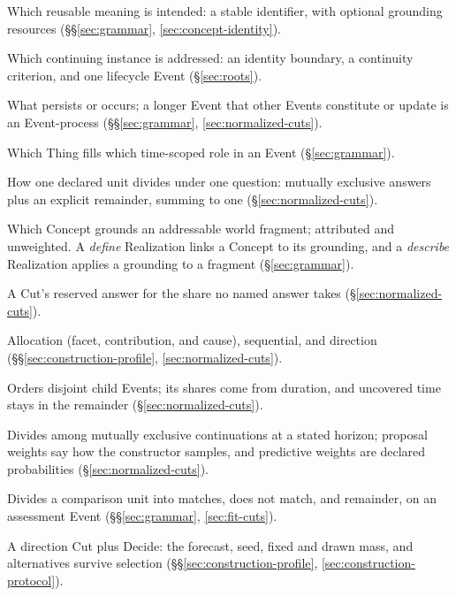 \documentclass[11pt,a4paper]{article}
\begin{document}
\begin{small}
\begin{description}[leftmargin=0pt,itemsep=1pt,parsep=0pt]
\item[Concept] Which reusable meaning is intended: a stable identifier, with
optional grounding resources (\S\S\ref{sec:grammar},
\ref{sec:concept-identity}).
\item[Thing] Which continuing instance is addressed: an identity boundary, a
continuity criterion, and one lifecycle Event (\S\ref{sec:roots}).
\item[Event] What persists or occurs; a longer Event that other Events
constitute or update is an Event-process (\S\S\ref{sec:grammar},
\ref{sec:normalized-cuts}).
\item[Binding] Which Thing fills which time-scoped role in an Event
(\S\ref{sec:grammar}).
\item[Cut] How one declared unit divides under one question: mutually exclusive
answers plus an explicit remainder, summing to one
(\S\ref{sec:normalized-cuts}).
\item[Realization] Which Concept grounds an addressable world fragment;
attributed and unweighted. A \emph{define} Realization links a Concept to its
grounding, and a \emph{describe} Realization applies a grounding to a fragment
(\S\ref{sec:grammar}).
\item[Remainder] A Cut's reserved answer for the share no named answer takes
(\S\ref{sec:normalized-cuts}).
\item[Five Cut profiles in three families] Allocation (facet, contribution, and
cause), sequential, and direction (\S\S\ref{sec:construction-profile},
\ref{sec:normalized-cuts}).
\item[Sequential Cut] Orders disjoint child Events; its shares come from
duration, and uncovered time stays in the remainder
(\S\ref{sec:normalized-cuts}).
\item[Direction Cut] Divides among mutually exclusive continuations at a stated
horizon; proposal weights say how the constructor samples, and predictive
weights are declared probabilities (\S\ref{sec:normalized-cuts}).
\item[Fit Cut] Divides a comparison unit into matches, does not match, and
remainder, on an assessment Event (\S\S\ref{sec:grammar}, \ref{sec:fit-cuts}).
\item[Roll] A direction Cut plus Decide: the forecast, seed, fixed and drawn
mass, and alternatives survive selection (\S\S\ref{sec:construction-profile},
\ref{sec:construction-protocol}).

\end{description}
\end{small}
\end{document}
